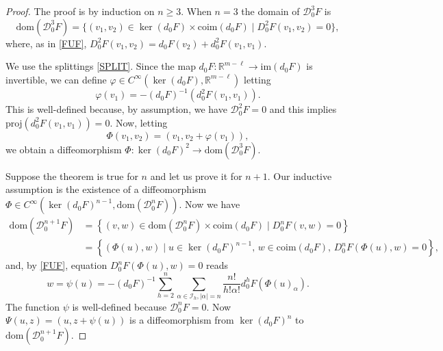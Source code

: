 \documentclass[12pt, reqno]{amsart}
\theoremstyle{plain}
\theoremstyle{definition}
\theoremstyle{remark}
\numberwithin{equation}{section}
\newcommand{\R}{\mathbb{R}}
\renewcommand{\phi}{\varphi}
\newcommand{\0}{\theta}
\renewcommand{\a}{\alpha}
\newcommand{\1}{{-1}}
\renewcommand{\l}{\ell}
\renewcommand{\=}{\coloneqq}
\renewcommand{\.}{\dots}
\newcommand{\mc}{\mathcal}
\newcommand{\proj}{\mathrm{proj}}
\newcommand{\dom}{\mathrm{dom}}
\begin{document}
\begin{proof} The proof is by induction on $n\geq 3$. When $n=3$  the domain of $\mc D_0^3 F$
is
 \[
  \dom(\mc D_0^3 F)=\big\{(v_1,v_2)\in \ker(d_0F)\times \mathrm{coim}(d_0 F)  \mid D_0^2F(v_1,v_2)=0\big\},
 \]
 where, as in \eqref{FUF}, 
$
 D_0^2 F(v_1,v_2) = d_0 F(v_2) +d ^2_0F(v_1,v_1) .
$


 
 
 We use the splittings \eqref{SPLIT}.
 Since the map $d_0 F : \R^{m-\l} \to \mathrm{im} (d_0 F)$ is invertible, we can define 
  $\phi \in C^\infty( \ker (d_0F ) ,  \R^{m-\l}) $ letting
 \[
   \phi ( v_1) =-   (d_0 F)^{-1} (d^2_0F(v_1,v_1)).
 \]
 This is well-defined
 because, 
 by assumption, we have   $ \mc D_0^2 F = 0$ and this implies $\proj(d^2_0F(v_1,v_1))=0$.
 Now, letting 
  \[
  \Phi(v_1,v_2) = ( v_1, v_2 +\phi(v_1)),
  \]
we obtain a diffeomorphism  $\Phi:\ker(d_0 F)^2 \to   \dom(\mc D_0^3 F)$. 
   
 
 Suppose the theorem is true for $n$ and let us prove it for $n+1$. 
Our inductive assumption is the existence of a diffeomorphism  $\Phi \in C^\infty ( \ker (d_0F )^{n-1} ,   \dom(\mc D_0^n F))$.
Now we have  
 \[
 \begin{split}
\dom(\mc D_0^{n+1} F) & =\left\{(v,w)\in \dom(\mc D_0^n F)\times \mathrm{coim}(d_0F) \mid D_0^nF(v,w)=0\right\}
\\
& =\left\{(\Phi(u) ,w)  \mid u\in \ker (d_0F )^{n-1},\, w \in\mathrm{coim}(d_0F),\,
D_0^nF(\Phi(u) ,w)=0\right\},
\end{split}
 \]
 and, by \eqref{FUF},
 equation $D_0^nF(\Phi(u) ,w)=0$ reads
 \[
w=\psi(u) = - ( d_0 F)^{-1}  \sum_{h=2}^n\sum_{\a\in \mathscr I_h, |\a|=n}\frac{n!}{h!\a!}d_0^hF(\Phi(u)_\a).
 \]
 The function $\psi$ is well-defined because $\mc D_0^n F=0$.
 Now $\Psi(u,z) = ( u, z+ \psi(u))$ is a diffeomorphism from $\ker (d_0F )^{n}$ to $ \dom(\mc D_0^{n+1} F)$.
 
\end{proof}

  
 
\end{document}
